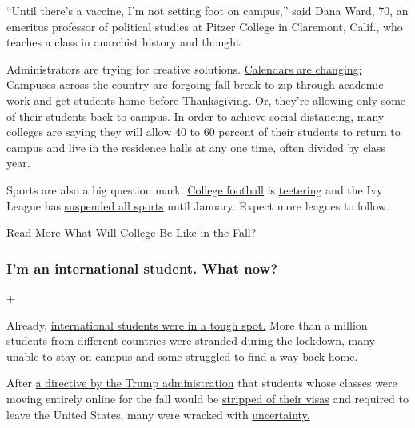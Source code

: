 ``Until there's a vaccine, I'm not setting foot on campus,'' said Dana
Ward, 70, an emeritus professor of political studies at Pitzer College
in Claremont, Calif., who teaches a class in anarchist history and
thought.

Administrators are trying for creative solutions.
\href{https://www.nytimes3xbfgragh.onion/2020/05/19/us/coronavirus-college-fall-semester.html}{Calendars
are changing:} Campuses across the country are forgoing fall break to
zip through academic work and get students home before Thanksgiving. Or,
they're allowing only
\href{https://www.nytimes3xbfgragh.onion/2020/07/06/us/coronavirus-universities-colleges-reopening.html}{some
of their students} back to campus. In order to achieve social
distancing, many colleges are saying they will allow 40 to 60 percent of
their students to return to campus and live in the residence halls at
any one time, often divided by class year.

Sports are also a big question mark.
\href{https://www.nytimes3xbfgragh.onion/2020/07/01/sports/ncaafootball/coronavirus-college-football-hbcus-clemson.html}{College
football} is
\href{https://www.nytimes3xbfgragh.onion/2020/07/10/sports/ncaafootball/coronavirus-college-football-season-canceled.html}{teetering}
and the Ivy League has
\href{https://www.nytimes3xbfgragh.onion/2020/07/08/sports/ncaafootball/ivy-league-fall-sports-football-coronavirus.html}{suspended
all sports} until January. Expect more leagues to follow.

 Read More
\href{https://www.nytimes3xbfgragh.onion/2020/06/03/magazine/covid-college-fall.html}{What
Will College Be Like in the Fall?}

\hypertarget{im-an-international-student-what-now}{%
\subsubsection{I'm an international student. What
now?}\label{im-an-international-student-what-now}}

+

Already,
\href{https://www.nytimes3xbfgragh.onion/2020/04/25/us/coronavirus-international-foreign-students-universities.html}{international
students were in a tough spot.} More than a million students from
different countries were stranded during the lockdown, many unable to
stay on campus and some struggled to find a way back home.

After
\href{https://www.nytimes3xbfgragh.onion/aponline/2020/07/06/us/politics/ap-us-virus-outbreak-international-students.html}{a
directive by the Trump administration} that students whose classes were
moving entirely online for the fall would be
\href{https://www.nytimes3xbfgragh.onion/2020/07/07/us/student-visas-coronavirus.html}{stripped
of their visas} and required to leave the United States, many were
wracked with
\href{https://www.nytimes3xbfgragh.onion/2020/07/09/world/international-students-visa-reaction.html}{uncertainty.}

